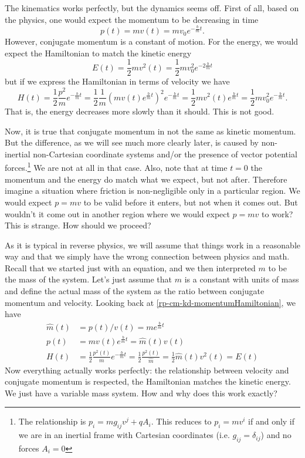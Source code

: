 The kinematics works perfectly, but the dynamics seems off. First of all, based on the physics, one would expect the momentum to be decreasing in time
\begin{equation}
	p(t)=m v(t) = m v_0 e^{-\frac{b}{m}t}.
\end{equation}
However, conjugate momentum is a constant of motion. For the energy, we would expect the Hamiltonian to match the kinetic energy
\begin{equation}
	E(t)=\frac{1}{2} m v^2(t) = \frac{1}{2} m v_0^2 e^{-2\frac{b}{m}t}
\end{equation}
but if we express the Hamiltonian in terms of velocity we have
\begin{equation}
	H(t)=\frac{1}{2} \frac{p^2}{m} e^{-\frac{b}{m}t} = \frac{1}{2} \frac{1}{m} \left( m v(t) e^{\frac{b}{m}t} \right)^2 e^{-\frac{b}{m}t}= \frac{1}{2} m v^2(t) e^{\frac{b}{m}t} = \frac{1}{2} m v_0^2 e^{-\frac{b}{m}t}.
\end{equation}
That is, the energy decreases more slowly than it should. This is not good.

Now, it is true that conjugate momentum in not the same as kinetic momentum. But the difference, as we will see much more clearly later, is caused by non-inertial non-Cartesian coordinate systems and/or the presence of vector potential forces.\footnote{The relationship is $p_i = m g_{ij} v^j + q A_i$. This reduces to $p_i = m v^i$ if and only if we are in an inertial frame with Cartesian coordinates (i.e. $g_{ij}=\delta_{ij}$) and no forces $A_i = 0$} We are not at all in that case. Also, note that at time $t=0$ the momentum and the energy do match what we expect, but not after. Therefore imagine a situation where friction is non-negligible only in a particular region. We would expect $p=mv$ to be valid before it enters, but not when it comes out. But wouldn't it come out in another region where we would expect $p=mv$ to work? This is strange. How should we proceed?

As it is typical in reverse physics, we will assume that things work in a reasonable way and that we simply have the wrong connection between physics and math. Recall that we started just with an equation, and we then interpreted $m$ to be the mass of the system. Let's just assume that $m$ is a constant with units of mass and define the actual mass of the system as the ratio between conjugate momentum and velocity. Looking back at \ref{rp-cm-kd-momentumHamiltonian}, we have 
\begin{equation}
	\begin{aligned}
	\hat{m}(t) &= p(t) / v(t) = m e^{\frac{b}{m}t} \\
	p(t) &= mv(t)e^{\frac{b}{m}t} = \hat{m}(t) v(t) \\
	H(t) &= \frac{1}{2} \frac{p^2(t)}{m}  e^{-\frac{b}{m}t} = \frac{1}{2} \frac{p^2(t)}{\hat{m}} = \frac{1}{2} \hat{m}(t) v^2(t) = E(t)
	\end{aligned}
\end{equation}
Now everything actually works perfectly: the relationship between velocity and conjugate momentum is respected, the Hamiltonian matches the kinetic energy. We just have a variable mass system. How and why does this work exactly?

